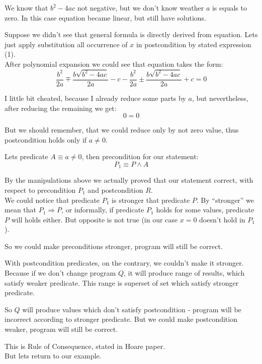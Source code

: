 \documentclass[twoside,twocolumn]{article}
\renewcommand{\implies}{\Rightarrow}
\begin{document}
We know that $b^2 - 4ac$ not negative, but we
don't know weather $a$ is equals to zero.
In this case equation became linear, but still have solutions. 

Suppose we didn't see that general formula is directly derived from equation.
Lets just apply substitution all occurrence of $x$ in postcondition by stated
expression (1). \\

After polynomial expansion we could see that equation takes the form:
$$\frac{b^2}{2a} \mp \frac{b\sqrt{b^2 - 4ac}}{2a} - c - \frac{b^2}{2a} \pm
\frac{b\sqrt{b^2 - 4ac}}{2a} + c = 0$$

I little bit cheated, because I already reduce some parts by $a$, but
nevertheless, after reducing the remaining we get:
$$ 0 = 0 $$

But we should remember, that we could reduce only by not zero value, thus
postcondition holds only if $a \neq 0$.

Lets predicate $A \equiv a \neq 0$, then precondition for our statement:
$$ P_1 \equiv P \wedge A $$

By the manipulations above we actually proved that our statement correct, with
respect to precondition $P_1$ and postcondition $R$. \\

We could notice that predicate $P_1$ is stronger that predicate $P$. By
``stronger'' we mean that $P_1 \implies P$, or informally, if predicate $P_1$
holds for some values, predicate $P$ will holds either. But opposite is not true
(in our case $x = 0$ doesn't hold in $P_1$).

So we could make preconditions stronger, program will still be correct.

With postcondition predicates, on the contrary, we couldn't make it
stronger.
Because if we don't change program $Q$, it will produce range of
results, which satisfy weaker predicate.
This range is superset of set which satisfy stronger predicate.

So $Q$ will produce values which don't satisfy postcondition - program will be
incorrect according to stronger predicate.
But we could make postcondition weaker, program will still be correct.

This is Rule of Consequence, stated in Hoare paper.\\

But lets return to our example.

\end{document}
